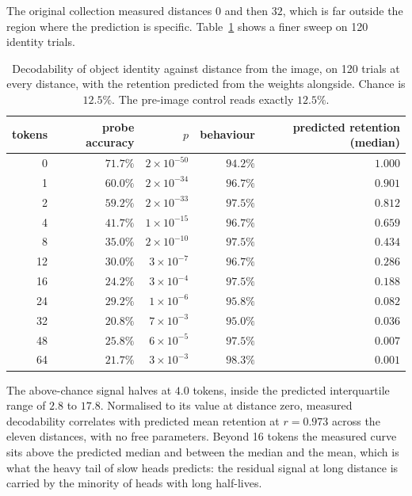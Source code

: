 \documentclass[11pt]{article}
\begin{document}
The original collection measured distances $0$ and then $32$, which is far
outside the region where the prediction is specific. Table~\ref{tab:fine} shows
a finer sweep on 120 identity trials.

\begin{table}[h]
\centering\small
\begin{tabular}{rrrrr}
\toprule
tokens & probe accuracy & $p$ & behaviour & predicted retention (median) \\
\midrule
0  & $71.7\%$ & $2\times10^{-50}$ & $94.2\%$ & $1.000$ \\
1  & $60.0\%$ & $2\times10^{-34}$ & $96.7\%$ & $0.901$ \\
2  & $59.2\%$ & $2\times10^{-33}$ & $97.5\%$ & $0.812$ \\
4  & $41.7\%$ & $1\times10^{-15}$ & $96.7\%$ & $0.659$ \\
8  & $35.0\%$ & $2\times10^{-10}$ & $97.5\%$ & $0.434$ \\
12 & $30.0\%$ & $3\times10^{-7}$  & $96.7\%$ & $0.286$ \\
16 & $24.2\%$ & $3\times10^{-4}$  & $97.5\%$ & $0.188$ \\
24 & $29.2\%$ & $1\times10^{-6}$  & $95.8\%$ & $0.082$ \\
32 & $20.8\%$ & $7\times10^{-3}$  & $95.0\%$ & $0.036$ \\
48 & $25.8\%$ & $6\times10^{-5}$  & $97.5\%$ & $0.007$ \\
64 & $21.7\%$ & $3\times10^{-3}$  & $98.3\%$ & $0.001$ \\
\bottomrule
\end{tabular}
\caption{Decodability of object identity against distance from the image, on
120 trials at every distance, with the retention predicted from the weights
alongside. Chance is $12.5\%$. The pre-image control reads exactly $12.5\%$.}
\label{tab:fine}
\end{table}

The above-chance signal halves at $4.0$ tokens, inside the predicted
interquartile range of $2.8$ to $17.8$. Normalised to its value at distance
zero, measured decodability correlates with predicted mean retention at
$r = 0.973$ across the eleven distances, with no free parameters. Beyond 16
tokens the measured curve sits above the predicted median and between the median
and the mean, which is what the heavy tail of slow heads predicts: the residual
signal at long distance is carried by the minority of heads with long
half-lives.
\end{document}
